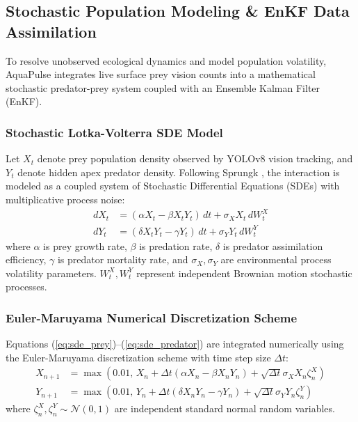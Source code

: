 \documentclass[11pt,a4paper]{article}
\newcommand{\citeblue}[1]{{\color{linkblue}\cite{#1}}}
\begin{document}
\subsection{Stochastic Population Modeling \& EnKF Data Assimilation}
\label{sec:stochastic_modeling}
To resolve unobserved ecological dynamics and model population volatility, AquaPulse integrates live surface prey vision counts into a mathematical stochastic predator-prey system coupled with an Ensemble Kalman Filter (EnKF).

\subsubsection{Stochastic Lotka-Volterra SDE Model}
Let $X_t$ denote prey population density observed by YOLOv8 vision tracking, and $Y_t$ denote hidden apex predator density. Following Sprungk \citeblue{sprungk2023}, the interaction is modeled as a coupled system of Stochastic Differential Equations (SDEs) with multiplicative process noise:
\begin{align}
dX_t &= (\alpha X_t - \beta X_t Y_t) \, dt + \sigma_X X_t \, dW_t^X \label{eq:sde_prey} \\
dY_t &= (\delta X_t Y_t - \gamma Y_t) \, dt + \sigma_Y Y_t \, dW_t^Y \label{eq:sde_predator}
\end{align}
where $\alpha$ is prey growth rate, $\beta$ is predation rate, $\delta$ is predator assimilation efficiency, $\gamma$ is predator mortality rate, and $\sigma_X, \sigma_Y$ are environmental process volatility parameters. $W_t^X, W_t^Y$ represent independent Brownian motion stochastic processes.

\subsubsection{Euler-Maruyama Numerical Discretization Scheme}
Equations (\ref{eq:sde_prey})--(\ref{eq:sde_predator}) are integrated numerically using the Euler-Maruyama discretization scheme with time step size $\Delta t$:
\begin{align}
X_{n+1} &= \max\left(0.01, \, X_n + \Delta t (\alpha X_n - \beta X_n Y_n) + \sqrt{\Delta t} \sigma_X X_n \zeta_n^X\right) \\
Y_{n+1} &= \max\left(0.01, \, Y_n + \Delta t (\delta X_n Y_n - \gamma Y_n) + \sqrt{\Delta t} \sigma_Y Y_n \zeta_n^Y\right)
\end{align}
where $\zeta_n^X, \zeta_n^Y \sim \mathcal{N}(0, 1)$ are independent standard normal random variables.
\end{document}
